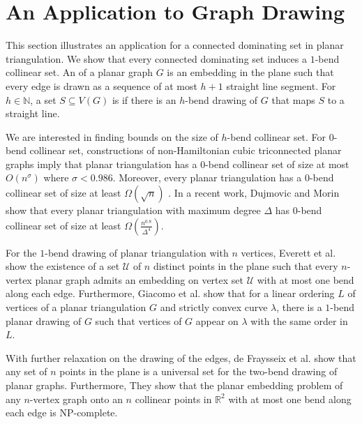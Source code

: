\section{An Application to Graph Drawing}
\label{one_bend}
This section illustrates an application for a connected dominating set in planar triangulation. We show that every connected dominating set induces a $1$-bend collinear set. An  of a planar graph $G$ is an embedding in the plane such that every edge is drawn as a sequence of at most $h + 1$ straight line segment. For $h \in \mathbb{N}$, a set $S \subseteq V(G)$ is  if there is an $h$-bend drawing of $G$ that maps $S$ to a straight line.

We are interested in finding bounds on the size of $h$-bend collinear set. For $0$-bend collinear set, constructions of non-Hamiltonian cubic triconnected planar graphs \cite{DBLP:journals/jct/GrunbaumW73,DBLP:conf/wg/RavskyV11,DBLP:journals/jocg/LozzoDFMR18} imply that planar triangulation has a 0-bend collinear set of size at most $O(n^{\sigma})$ where $\sigma < 0.986$. Moreover, every planar triangulation has a 0-bend collinear set of size at least $\Omega(\sqrt{n})$ \cite{DBLP:journals/dcg/BoseDHLMW09} \cite{DBLP:journals/jgaa/Dujmovic17}. In a recent work, Dujmovic and Morin \cite{DBLP:conf/compgeom/DujmovicM19} show that every planar triangulation with maximum degree $\Delta$ has $0$-bend collinear set of size at least $\Omega(\frac{n^{0.8}}{\Delta^4})$.

For the $1$-bend drawing of planar triangulation with $n$ vertices,  Everett et al. \cite{DBLP:conf/gd/EverettLLW07} show the existence of a set $\mathcal{U}$ of $n$ distinct points in the plane such that every $n$-vertex planar graph admits an embedding on vertex set $\mathcal{U}$ with at most one bend along each edge. Furthermore, Giacomo et al. \cite{DBLP:journals/comgeo/GiacomoDLW05} show that for a linear ordering $L$ of vertices of a planar triangulation $G$ and strictly convex curve $\lambda$, there is a $1$-bend planar drawing of $G$ such that vertices of $G$ appear on $\lambda$ with the same order in $L$.

With further relaxation on the drawing of the edges, de Fraysseix et al. \cite{DBLP:journals/combinatorica/FraysseixPP90} show that any set of $n$ points in the plane is a universal set for the two-bend drawing of planar graphs. Furthermore, They show that the planar embedding problem of any $n$-vertex graph onto an $n$ collinear points in $\mathbb{R}^2$ with at most one bend along each edge is NP-complete.

